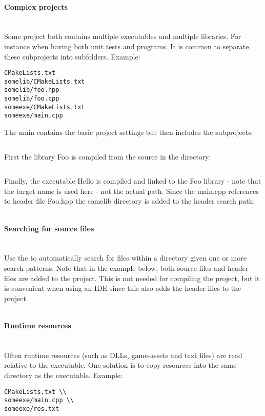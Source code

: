\documentclass[11pt,letter,landscape]{scrartcl} %
\newcommand{\sectiontitle}[1]{\paragraph{#1} \ \\} %
\begin{document}
\begin{multicols}{2}
\sectiontitle{Complex projects}

Some project both contains multiple executables and multiple libraries. For instance when having both unit tests and programs. It is common to separate these subprojects into subfolders. Example:
\begin{verbatim}
CMakeLists.txt
somelib/CMakeLists.txt
somelib/foo.hpp
somelib/foo.cpp
someexe/CMakeLists.txt
someexe/main.cpp
\end{verbatim}

\vspace{\baselineskip} %

The main  contains the basic project settings but then includes the subprojects:

\inputminted{cmake}{examples/example6/CMakeLists.txt}

First the library Foo is compiled from the source in the   directory:

\inputminted{cmake}{examples/example6/somelib/CMakeLists.txt}

Finally, the executable Hello is compiled and linked to the Foo library - note that the target name is used here - not the actual path. Since the main.cpp references to header file Foo.hpp the somelib directory is added to the header search path:

\inputminted{cmake}{examples/example6/someexe/CMakeLists.txt}

\sectiontitle{Searching for source files}

Use the  to automatically search for files within a directory given one or more search patterns. Note that in the example below, both source files and header files are added to the project. This is not needed for compiling the project, but it is convenient when using an IDE since this also adds the header files to the project.

\inputminted{cmake}{examples/example6-find/CMakeLists.txt}

\sectiontitle{Runtime resources}

Often runtime resources (such as DLLs, game-assets and text files) are read relative to the executable. One solution is to copy resources into the same directory as the executable. Example:

\begin{verbatim}
CMakeLists.txt \\
someexe/main.cpp \\
someexe/res.txt
\end{verbatim}


\end{multicols}
\end{document}
